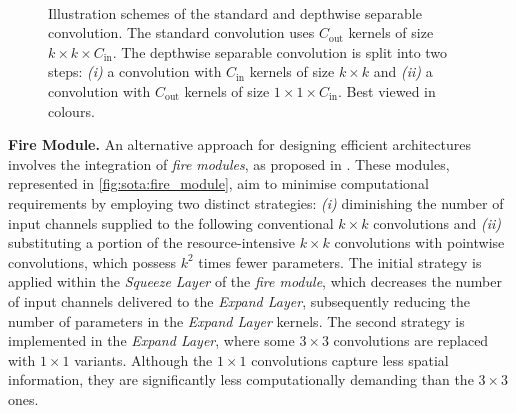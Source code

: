 \begin{figure}[htbp]
  \centering
  \\
  \vspace{1cm}
  \caption{Illustration schemes of the standard and depthwise separable
    convolution. The standard convolution uses $C_\text{out}$ kernels of size
    $k\times k \times C_\text{in}$. The depthwise separable convolution is
    split into two steps: \emph{(i)} a convolution with $C_\text{in}$ kernels
    of size $k \times k$ and \emph{(ii)} a convolution with $C_\text{out}$
    kernels of size $1\times 1 \times C_\text{in}$.
    Best viewed in colours.}
  \label{fig:sota:depthwise_conv_vs_standard_conv}
\end{figure}


\noindent \textbf{Fire Module.} An alternative approach for designing efficient
architectures involves the integration of \emph{fire modules}, as proposed in
\cite{DBLP:journals/corr/IandolaMAHDK16}. These modules, represented in
\cref{fig:sota:fire_module}, aim to minimise computational requirements by
employing two distinct strategies: \emph{(i)} diminishing the number of input
channels supplied to the following conventional $k\times k$ convolutions and
\emph{(ii)} substituting a portion of the resource-intensive $k\times k$
convolutions with pointwise convolutions, which possess $k^2$ times fewer
parameters. The initial strategy is applied within the \emph{Squeeze Layer} of
the \emph{fire module}, which decreases the number of input channels delivered
to the \emph{Expand Layer}, subsequently reducing the number of parameters in
the \emph{Expand Layer} kernels. The second strategy is implemented in the
\emph{Expand Layer}, where some $3\times3$ convolutions are replaced with
$1\times1$ variants. Although the $1\times1$ convolutions capture less spatial
information, they are significantly less computationally demanding than the
$3\times3$ ones.\\

